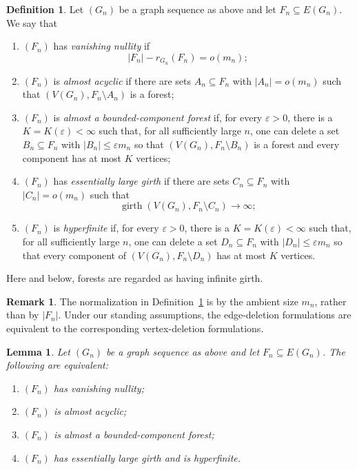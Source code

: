 \documentclass{article}
\theoremstyle{plain}
\newtheorem{lem}[thm]{Lemma}
\theoremstyle{definition}
\newtheorem{defn}[thm]{Definition}
\newtheorem{rem}[thm]{Remark}
\newcommand{\eps}{\varepsilon}
\begin{document}
\begin{defn}\label{def:finite-edge-properties}
Let $(G_n)$ be a graph sequence as above and let $F_n\subseteq E(G_n)$. We say that
\begin{enumerate}
    \item $(F_n)$ has \emph{vanishing nullity} if
    \[
        |F_n|-r_{G_n}(F_n)=o(m_n);
    \]

    \item $(F_n)$ is \emph{almost acyclic} if there are sets $A_n\subseteq F_n$ with $|A_n|=o(m_n)$ such that $(V(G_n),F_n\setminus A_n)$ is a forest;

    \item $(F_n)$ is \emph{almost a bounded-component forest} if, for every $\eps>0$, there is a $K=K(\eps)<\infty$ such that, for all sufficiently large $n$, one can delete a set $B_n\subseteq F_n$ with $|B_n|\leq \eps m_n$ so that $(V(G_n),F_n\setminus B_n)$ is a forest and every component has at most $K$ vertices;

    \item $(F_n)$ has \emph{essentially large girth} if there are sets $C_n\subseteq F_n$ with $|C_n|=o(m_n)$ such that
    \[
        \operatorname{girth}(V(G_n),F_n\setminus C_n)\longrightarrow\infty;
    \]

    \item $(F_n)$ is \emph{hyperfinite} if, for every $\eps>0$, there is a $K=K(\eps)<\infty$ such that, for all sufficiently large $n$, one can delete a set $D_n\subseteq F_n$ with $|D_n|\leq \eps m_n$ so that every component of $(V(G_n),F_n\setminus D_n)$ has at most $K$ vertices.
\end{enumerate}
Here and below, forests are regarded as having infinite girth. 

\end{defn}

\begin{rem}
The normalization in Definition~\ref{def:finite-edge-properties} is by the ambient size $m_n$, rather than by $|F_n|$. Under our standing assumptions, the edge-deletion formulations are equivalent to the corresponding vertex-deletion formulations.
\end{rem}

\begin{lem}\label{lem:almost_acyclic_characterizations}
Let $(G_n)$ be a graph sequence as above and let $F_n\subseteq E(G_n)$. The following are equivalent:
\begin{enumerate}
    \item\label{itm:rank_excess} $(F_n)$ has vanishing nullity;
    \item\label{itm:almost_acyclic} $(F_n)$ is almost acyclic;
    \item\label{itm:almost_bdd_forest} $(F_n)$ is almost a bounded-component forest;
    \item\label{itm:ess_large_girth_hyperfinite} $(F_n)$ has essentially large girth and is hyperfinite.
\end{enumerate}
\end{lem}
\end{document}
